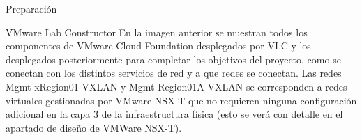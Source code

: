 \begin{subsection}{Preparación}
\begin{subsubsection}{VMware Lab Constructor}
      En la imagen anterior se muestran todos los componentes de VMware Cloud Foundation desplegados por VLC y los desplegados posteriormente para completar los objetivos del proyecto, como se conectan con los distintos servicios de red y a que redes se conectan. Las redes Mgmt-xRegion01-VXLAN y Mgmt-Region01A-VXLAN se corresponden a redes virtuales gestionadas por VMware NSX-T que no requieren ninguna configuración adicional en la capa 3 de la infraestructura física (esto se verá con detalle en el apartado de diseño de VMWare NSX-T).
      \FloatBarrier
    \end{subsubsection}
    
  \end{subsection}
